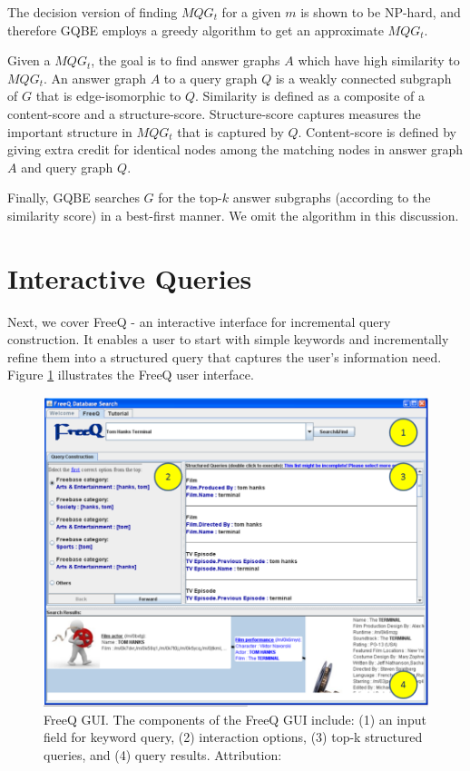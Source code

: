 \documentclass[a4paper, twoside, 12pt]{report}
\begin{document}
 The decision version of finding $MQG_t$ for a given $m$ is shown to be NP-hard, and therefore GQBE employs a greedy algorithm to get an approximate $MQG_t$.

 Given a $MQG_t$, the goal is to find answer graphs $A$ which have high similarity to $MQG_t$. An answer graph $A$ to a query graph $Q$ is a
 weakly connected subgraph of $G$ that is edge-isomorphic to $Q$. Similarity is defined as a composite of a content-score and a structure-score. Structure-score captures measures the important structure in $MQG_t$ that is captured by $Q$. Content-score is defined by giving extra credit for identical nodes among the matching nodes in answer graph $A$ and query graph $Q$.

 Finally, GQBE searches $G$ for the top-$k$ answer subgraphs (according to the similarity score) in a best-first manner. We omit the algorithm in this discussion.

 \section{Interactive Queries}

 Next, we cover FreeQ \cite{demidova2012freeq} - an interactive interface for incremental query construction. It enables a user to start with simple keywords and incrementally refine them into a structured query that captures the user's information need. Figure \ref{fig:freeq} illustrates the FreeQ user interface.

 \begin{figure}[h!]
 \includegraphics[scale=0.45]{freeq.png}
 \caption{FreeQ GUI. The components of the FreeQ
GUI include: (1) an input field for keyword query,
(2) interaction options, (3) top-k structured queries,
and (4) query results. Attribution: \cite{demidova2012freeq}}
 \label{fig:freeq}
 \end{figure}
\end{document}
